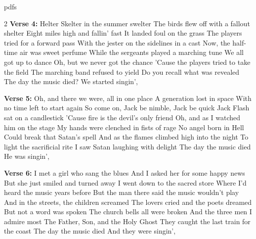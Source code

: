pdfs\documentclass[../../../songbookMain]{subfiles}
\begin{document}
\begin{guitar}
\begin{multicols}{2}
\textbf{Verse 4:}
Helter Skelter in the summer swelter
The birds flew off with a fallout shelter
Eight miles high and fallin' fast
It landed foul on the grass
The players tried for a forward pass
With the jester on the sidelines in a cast
Now, the half-time air was sweet perfume
While the sergeants played a marching tune
We all got up to dance
Oh, but we never got the chance
'Cause the players tried to take the field
The marching band refused to yield
Do you recall what was revealed
The day the music died?
We started singin',

\textbf{Verse 5:}
Oh, and there we were, all in one place
A generation lost in space
With no time left to start again
So come on, Jack be nimble, Jack be quick
Jack Flash sat on a candlestick
'Cause fire is the devil's only friend
Oh, and as I watched him on the stage
My hands were clenched in fists of rage
No angel born in Hell
Could break that Satan's spell
And as the flames climbed high into the night
To light the sacrificial rite
I saw Satan laughing with delight
The day the music died
He was singin',

\textbf{Verse 6:}
I met a girl who sang the blues
And I asked her for some happy news
But she just smiled and turned away
I went down to the sacred store
Where I'd heard the music years before
But the man there said the music wouldn't play
And in the streets, the children screamed
The lovers cried and the poets dreamed
But not a word was spoken
The church bells all were broken
And the three men I admire most
The Father, Son, and the Holy Ghost
They caught the last train for the coast
The day the music died
And they were singin',

\end{multicols}

\end{guitar}
\end{document}

